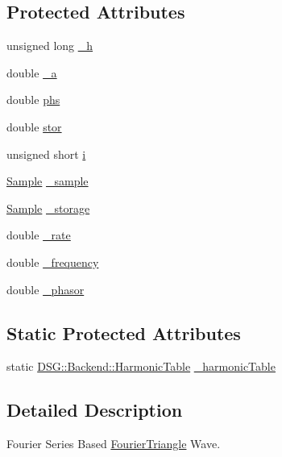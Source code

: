 \subsection*{Protected Attributes}
\begin{DoxyCompactItemize}
\item 
unsigned long \hyperlink{classDSG_1_1FourierTriangle_a855d5d0d221588639f079f463cd2141d}{\+\_\+h}
\item 
double \hyperlink{classDSG_1_1FourierTriangle_ad3d0e6a3f00bef1913c8a2a11a72dd38}{\+\_\+a}
\item 
double \hyperlink{classDSG_1_1FourierTriangle_add084978591cca94be14319f78d15216}{phs}
\item 
double \hyperlink{classDSG_1_1FourierTriangle_ab8668b608e3bbbd833620b10316b9c67}{stor}
\item 
unsigned short \hyperlink{classDSG_1_1FourierTriangle_a5e5749c6efba1470dfd136b50176d249}{i}
\item 
\hyperlink{classDSG_1_1Sample}{Sample} \hyperlink{classDSG_1_1FourierGenerator_ab96bed1cd59c42e82a689036e5c62bef}{\+\_\+sample}
\item 
\hyperlink{classDSG_1_1Sample}{Sample} \hyperlink{classDSG_1_1FourierGenerator_a6b7f2439b26914cc9df6b6975a2cedac}{\+\_\+storage}
\item 
double \hyperlink{classDSG_1_1SignalGenerator_aa10f6c85d9adee901139ea7fb346f39d}{\+\_\+rate}
\item 
double \hyperlink{classDSG_1_1SignalGenerator_a67e296e3506dcdf09402c667cddff9ac}{\+\_\+frequency}
\item 
double \hyperlink{classDSG_1_1SignalGenerator_ac2271b582bf699275f077ecb642a8cd9}{\+\_\+phasor}
\end{DoxyCompactItemize}
\subsection*{Static Protected Attributes}
\begin{DoxyCompactItemize}
\item 
static \hyperlink{classDSG_1_1Backend_1_1HarmonicTable}{D\+S\+G\+::\+Backend\+::\+Harmonic\+Table} \hyperlink{classDSG_1_1FourierGenerator_aedac2cf90997418836d064c90540249d}{\+\_\+harmonic\+Table}
\end{DoxyCompactItemize}


\subsection{Detailed Description}
Fourier Series Based \hyperlink{classDSG_1_1FourierTriangle}{Fourier\+Triangle} Wave. 


